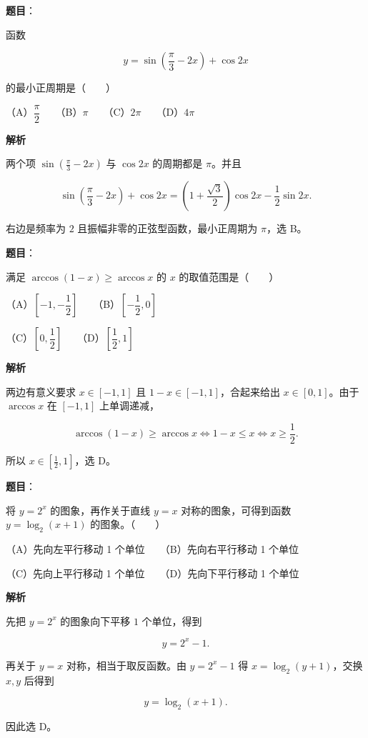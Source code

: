 \begin{answer}

\textbf{题目}：

函数

\nopagebreak[4]
\[
y=\sin\left(\dfrac\pi3-2x\right)+\cos2x
\]

的最小正周期是\mbox{（　　）}

（A）$\dfrac\pi2$　　（B）$\pi$　　（C）$2\pi$　　（D）$4\pi$

\textbf{解析}

两个项 $\sin(\frac\pi3-2x)$ 与 $\cos2x$ 的周期都是 $\pi$。并且

\nopagebreak[4]
\[
\sin\left(\frac\pi3-2x\right)+\cos2x
=\left(1+\frac{\sqrt3}{2}\right)\cos2x-\frac12\sin2x.
\]

右边是频率为 $2$ 且振幅非零的正弦型函数，最小正周期为 $\pi$，选 B。


\end{answer}
\begin{answer}

\textbf{题目}：

满足 $\arccos(1-x)\geqslant\arccos x$ 的 $x$ 的取值范围是\mbox{（　　）}

（A）$\left[-1,-\dfrac12\right]$　　（B）$\left[-\dfrac12,0\right]$

（C）$\left[0,\dfrac12\right]$　　（D）$\left[\dfrac12,1\right]$

\textbf{解析}

两边有意义要求 $x\in[-1,1]$ 且 $1-x\in[-1,1]$，合起来给出 $x\in[0,1]$。由于 $\arccos x$ 在 $[-1,1]$ 上单调递减，

\nopagebreak[4]
\[
\arccos(1-x)\geqslant\arccos x
\iff 1-x\leqslant x
\iff x\geqslant\frac12.
\]

所以 $x\in[\frac12,1]$，选 D。


\end{answer}
\begin{answer}

\textbf{题目}：

将 $y=2^x$ 的图象\gkblank{}，再作关于直线 $y=x$ 对称的图象，可得到函数 $y=\log_2(x+1)$ 的图象。\mbox{（　　）}

（A）先向左平行移动 1 个单位　　（B）先向右平行移动 1 个单位

（C）先向上平行移动 1 个单位　　（D）先向下平行移动 1 个单位

\textbf{解析}

先把 $y=2^x$ 的图象向下平移 $1$ 个单位，得到

\nopagebreak[4]
\[
y=2^x-1.
\]

再关于 $y=x$ 对称，相当于取反函数。由 $y=2^x-1$ 得 $x=\log_2(y+1)$，交换 $x,y$ 后得到

\nopagebreak[4]
\[
y=\log_2(x+1).
\]

因此选 D。


\end{answer}
